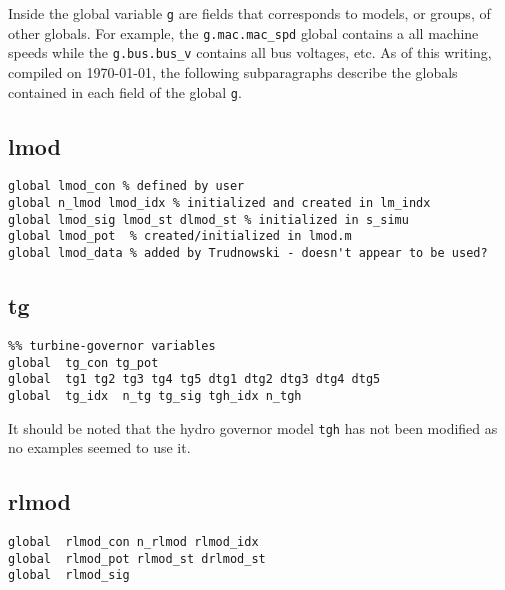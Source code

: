 Inside the global variable \verb|g| are fields that corresponds to models, or groups, of other globals.
For example, the \verb|g.mac.mac_spd| global contains a all machine speeds while the \verb|g.bus.bus_v| contains all bus voltages, etc.
As of this writing, compiled on \today, the following subparagraphs describe the globals contained in each field of the global \verb|g|. 

\subsection{lmod}
\begin{verbatim}
global lmod_con % defined by user
global n_lmod lmod_idx % initialized and created in lm_indx
global lmod_sig lmod_st dlmod_st % initialized in s_simu
global lmod_pot  % created/initialized in lmod.m 
global lmod_data % added by Trudnowski - doesn't appear to be used?
\end{verbatim}

\subsection{tg}
\begin{verbatim}
%% turbine-governor variables
global  tg_con tg_pot
global  tg1 tg2 tg3 tg4 tg5 dtg1 dtg2 dtg3 dtg4 dtg5
global  tg_idx  n_tg tg_sig tgh_idx n_tgh
\end{verbatim}
It should be noted that the hydro governor model \verb|tgh| has not been modified as no examples seemed to use it.

\subsection{rlmod}
\begin{verbatim}
global  rlmod_con n_rlmod rlmod_idx
global  rlmod_pot rlmod_st drlmod_st
global  rlmod_sig
\end{verbatim}
